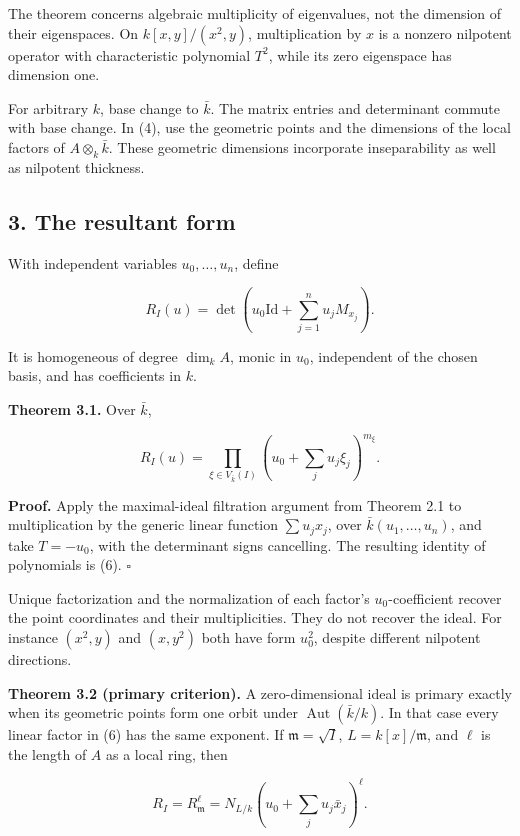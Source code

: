 \documentclass[
]{article}
\begin{document}
The theorem concerns algebraic multiplicity of eigenvalues, not the
dimension of their eigenspaces. On \(k[x,y]/(x^2,y)\), multiplication by
\(x\) is a nonzero nilpotent operator with characteristic polynomial
\(T^2\), while its zero eigenspace has dimension one.

For arbitrary \(k\), base change to \(\bar k\). The matrix entries and
determinant commute with base change. In (4), use the geometric points
and the dimensions of the local factors of \(A\otimes_k\bar k\). These
geometric dimensions incorporate inseparability as well as nilpotent
thickness.

\subsection{3. The resultant form}\label{the-resultant-form}

With independent variables \(u_0,\ldots,u_n\), define

\[
R_I(u)=\det\left(u_0\mathrm{Id}+\sum_{j=1}^nu_jM_{x_j}\right).
\tag{5}
\]

It is homogeneous of degree \(\dim_k A\), monic in \(u_0\), independent
of the chosen basis, and has coefficients in \(k\).

\textbf{Theorem 3.1.} Over \(\bar k\),

\[
R_I(u)=\prod_{\xi\in V_{\bar k}(I)}
\left(u_0+\sum_j u_j\xi_j\right)^{m_\xi}.
\tag{6}
\]

\textbf{Proof.} Apply the maximal-ideal filtration argument from Theorem
2.1 to multiplication by the generic linear function \(\sum u_jx_j\),
over \(\bar k(u_1,\ldots,u_n)\), and take \(T=-u_0\), with the
determinant signs cancelling. The resulting identity of polynomials is
(6). \(\square\)

Unique factorization and the normalization of each factor's
\(u_0\)-coefficient recover the point coordinates and their
multiplicities. They do not recover the ideal. For instance \((x^2,y)\)
and \((x,y^2)\) both have form \(u_0^2\), despite different nilpotent
directions.

\textbf{Theorem 3.2 (primary criterion).} A zero-dimensional ideal is
primary exactly when its geometric points form one orbit under
\(\operatorname{Aut}(\bar k/k)\). In that case every linear factor in
(6) has the same exponent. If \(\mathfrak m=\sqrt I\),
\(L=k[x]/\mathfrak m\), and \(\ell\) is the length of \(A\) as a local
ring, then

\[
R_I=R_{\mathfrak m}^{\ell}
=N_{L/k}\left(u_0+\sum_j u_j\bar x_j\right)^{\ell}.
\tag{7}
\]
\end{document}
